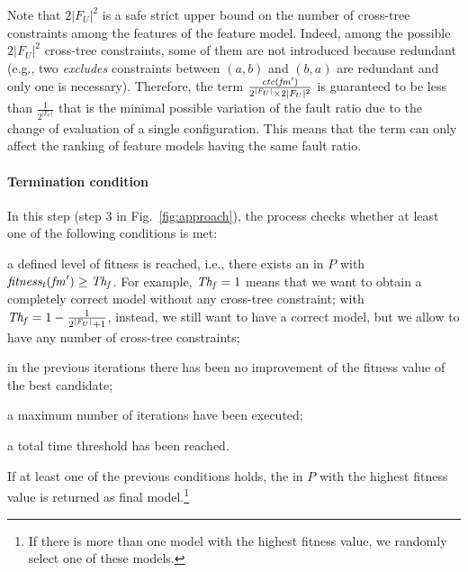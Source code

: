 \begin{tikzborder}{\cite{Gargantini16:validation}}
\begin{tikzborder}{\cite{gargantini_combinatorial_2017}}
\begin{tikzborder}{\cite{gargantini_combinatorial_2017}}
\begin{tikzborder}{\cite{garn2019}}
\begin{tikzborder}{\cite{arcaini2019achieving}}
	\bb Note that $2 |F_U|^2$ is a safe strict upper bound on the number of cross-tree constraints among the features of the feature model. Indeed, among the possible $2|F_U|^2$ cross-tree constraints, some of them are not introduced because redundant (e.g., two {\it excludes} constraints between $(a,b)$ and $(b,a)$ are redundant and only one is necessary). Therefore, the term $\frac{\mathit{ctc}(\mathit{fm}^\prime)}{2^{|F_U|} \times 2|F_U|^2}$ is guaranteed to be less than $\frac{1}{2^{|F_U|}}$ that is the minimal possible variation of the fault ratio due to the change of evaluation of a single configuration. This means that the term can only affect the ranking of feature models having the same fault ratio.\be
	
	\paragraph{\bf Termination condition}%
	\bb In this step (step 3 in Fig.~\ref{fig:approach}), the process checks whether at least one of the following conditions is met:
	\begin{compactitem}
		\item a defined level of fitness \thF is reached, i.e., there exists an \fmp in $P$ with $\mathit{fitness_t}(\mathit{fm}^\prime) \ge \mathit{Th_f}$. For example, $\mathit{Th_f}=1$ means that we want to obtain a completely correct model without any cross-tree constraint; with $\mathit{Th_f} = 1 - \frac{1}{2^{|F_U|} + 1}$, instead, we still want to have a correct model, but we allow to have any number of cross-tree constraints;
		\item in the previous \thNI iterations there has been no improvement of the fitness value of the best candidate;
		\item a maximum number \thI of iterations have been executed;
		\item a total time threshold \thT has been reached.
	\end{compactitem}
	
	If at least one of the previous conditions holds, the \fmp in $P$ with the highest fitness value is returned as final model.\footnote{If there is more than one model with the highest fitness value, we randomly select one of these models.}\be
	

\end{tikzborder}
\end{tikzborder}
\end{tikzborder}
\end{tikzborder}
\end{tikzborder}
